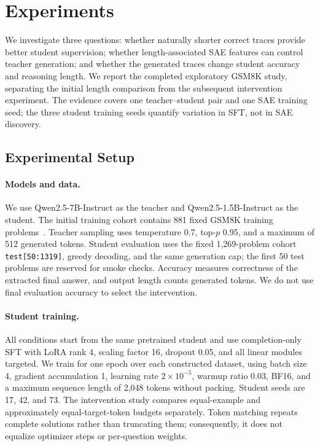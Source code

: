 \section{Experiments}
\label{sec:experiments}

We investigate three questions: whether naturally shorter correct traces provide better student supervision; whether length-associated SAE features can control teacher generation; and whether the generated traces change student accuracy and reasoning length.
We report the completed exploratory GSM8K study, separating the initial length comparison from the subsequent intervention experiment.
The evidence covers one teacher--student pair and one SAE training seed; the three student training seeds quantify variation in SFT, not in SAE discovery.

\subsection{Experimental Setup}
\label{sec:experimental_setup}

\paragraph{Models and data.}
We use Qwen2.5-7B-Instruct as the teacher and Qwen2.5-1.5B-Instruct as the student.
The initial training cohort contains 881 fixed GSM8K training problems~\citep{cobbe2021training}.
Teacher sampling uses temperature 0.7, top-$p$ 0.95, and a maximum of 512 generated tokens.
Student evaluation uses the fixed 1,269-problem cohort \texttt{test[50:1319]}, greedy decoding, and the same generation cap; the first 50 test problems are reserved for smoke checks.
Accuracy measures correctness of the extracted final answer, and output length counts generated tokens.
We do not use final evaluation accuracy to select the intervention.

\paragraph{Student training.}
All conditions start from the same pretrained student and use completion-only SFT with LoRA rank 4, scaling factor 16, dropout 0.05, and all linear modules targeted.
We train for one epoch over each constructed dataset, using batch size 4, gradient accumulation 1, learning rate $2\times10^{-5}$, warmup ratio 0.03, BF16, and a maximum sequence length of 2,048 tokens without packing.
Student seeds are 17, 42, and 73.
The intervention study compares equal-example and approximately equal-target-token budgets separately.
Token matching repeats complete solutions rather than truncating them; consequently, it does not equalize optimizer steps or per-question weights.

